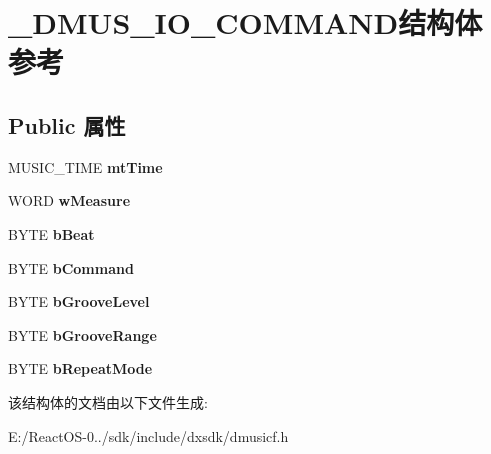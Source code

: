 \hypertarget{struct___d_m_u_s___i_o___c_o_m_m_a_n_d}{}\section{\+\_\+\+D\+M\+U\+S\+\_\+\+I\+O\+\_\+\+C\+O\+M\+M\+A\+N\+D结构体 参考}
\label{struct___d_m_u_s___i_o___c_o_m_m_a_n_d}
\subsection*{Public 属性}
\begin{DoxyCompactItemize}
\item 
\mbox{\label{struct___d_m_u_s___i_o___c_o_m_m_a_n_d_af225d04b4ea2e800dd8ef66fb630f1f3}} 
M\+U\+S\+I\+C\+\_\+\+T\+I\+ME {\bfseries mt\+Time}
\item 
\mbox{\label{struct___d_m_u_s___i_o___c_o_m_m_a_n_d_adaa4627f74b0ac03d0d28ffeb9dc0b7b}} 
W\+O\+RD {\bfseries w\+Measure}
\item 
\mbox{\label{struct___d_m_u_s___i_o___c_o_m_m_a_n_d_a585deb396adb554bf033dca19019233a}} 
B\+Y\+TE {\bfseries b\+Beat}
\item 
\mbox{\label{struct___d_m_u_s___i_o___c_o_m_m_a_n_d_a0878e431a7f1838a5d38003e792f7eef}} 
B\+Y\+TE {\bfseries b\+Command}
\item 
\mbox{\label{struct___d_m_u_s___i_o___c_o_m_m_a_n_d_a0ef53cb4600797509443af496f3c12b5}} 
B\+Y\+TE {\bfseries b\+Groove\+Level}
\item 
\mbox{\label{struct___d_m_u_s___i_o___c_o_m_m_a_n_d_a76ed686ae329e68b92464873454d1113}} 
B\+Y\+TE {\bfseries b\+Groove\+Range}
\item 
\mbox{\label{struct___d_m_u_s___i_o___c_o_m_m_a_n_d_a3e3e1ad5759ad4f6854b7720dce569ee}} 
B\+Y\+TE {\bfseries b\+Repeat\+Mode}
\end{DoxyCompactItemize}


该结构体的文档由以下文件生成\+:\begin{DoxyCompactItemize}
\item 
E\+:/\+React\+O\+S-\/0../sdk/include/dxsdk/dmusicf.\+h\end{DoxyCompactItemize}
